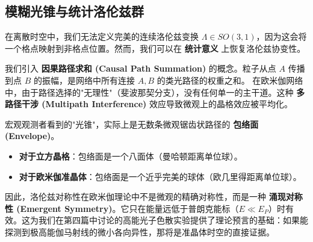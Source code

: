 \subsection{模糊光锥与统计洛伦兹群}

在离散时空中，我们无法定义完美的连续洛伦兹变换 $\Lambda \in SO(3,1)$，因为这会将一个格点映射到非格点位置。然而，我们可以在 \textbf{统计意义} 上恢复洛伦兹协变性。

我们引入 \textbf{因果路径求和 (Causal Path Summation)} 的概念。粒子从点 $A$ 传播到点 $B$ 的振幅，是网络中所有连接 $A, B$ 的类光路径的权重之和。
在欧米伽网络中，由于路径选择的"无理性"（斐波那契分支），没有任何单一的主干道。这种 \textbf{多路径干涉 (Multipath Interference)} 效应导致微观上的晶格效应被平均化。

宏观观测者看到的"光锥"，实际上是无数条微观锯齿状路径的 \textbf{包络面 (Envelope)}。

\begin{itemize}
\item \textbf{对于立方晶格}：包络面是一个八面体（曼哈顿距离单位球）。
\item \textbf{对于欧米伽准晶体}：包络面是一个近乎完美的球体（欧几里得距离单位球）。
\end{itemize}

因此，洛伦兹对称性在欧米伽理论中不是微观的精确对称性，而是一种 \textbf{涌现对称性 (Emergent Symmetry)}。它只在能量远低于普朗克能标（$E \ll E_P$）时有效。这为我们在第四篇中讨论的高能光子色散实验提供了理论预言的基础：如果能探测到极高能伽马射线的微小各向异性，那将是准晶体时空的直接证据。
